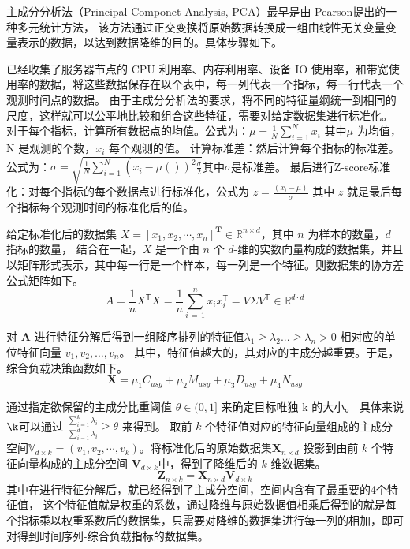 主成分分析法（Principal Componet Analysis, PCA）最早是由 Pearson\cite{kpfrs1901lines}提出的一种多元统计方法，
该方法通过正交变换将原始数据转换成一组由线性无关变量变量表示的数据，以达到数据降维的目的\cite{李可佳2023基于主成分分析和函数机制的差分隐私线性回归算法}。具体步骤如下。

已经收集了服务器节点的 CPU 利用率、内存利用率、设备 IO 使用率，和带宽使用率的数据，将这些数据保存在以个表中，每一列代表一个指标，每一行代表一个观测时间点的数据。
由于主成分分析法的要求，将不同的特征量纲统一到相同的尺度，这样就可以公平地比较和组合这些特征，需要对给定数据集进行标准化。
对于每个指标，计算所有数据点的均值。公式为：$\mu=\frac{1}{N}\sum_{i=1}^{N}x_{i}$ 其中$\mu$ 为均值，N 是观测的个数，$x_{i}$ 每个观测的值。
计算标准差：然后计算每个指标的标准差。公式为：$\sigma = \sqrt{\frac{1}{N} \sum_{i = 1}^{N} \left(\right. x_{i} - \mu \left(\left.\right)\right)^{2}\frac{\sigma}{2}}$其中$\sigma$是标准差。
最后进行Z-score标准化：对每个指标的每个数据点进行标准化，公式为 $z = \frac{(x_{i} - \mu)}{\sigma}$ 其中 $z$ 就是最后每个指标每个观测时间的标准化后的值。

给定标准化后的数据集 $X = [x_1, x_2, \cdots, x_n]^{\mathbf{T}} \in \mathbb{R}^{n \times d}$，其中 $n$ 为样本的数量，$d$ 指标的数量，
结合在一起，\( X \) 是一个由 \( n \) 个 \( d \)-维的实数向量构成的数据集，并且以矩阵形式表示，其中每一行是一个样本，每一列是一个特征。则数据集的协方差公式矩阵如下。
\begin{equation}
  A={\frac{1}{n}}X^{\mathsf{T}}X={\frac{1}{n}}\sum_{i\,=\,1}^{n}x_{i}x_{i}^{\mathsf{T}}=V\Sigma V^{\mathsf{T}}\in\mathbb{R}^{d\cdot d}
\end{equation}

对 $\mathbf{A}$ 进行特征分解后得到一组降序排列的特征值$\lambda_1 \ge \lambda_2 ... \ge \lambda_n > 0$ 相对应的单位特征向量 $v_1, v_2, \dots, v_n$。
其中，特征值越大的，其对应的主成分越重要。于是，综合负载决策函数如下。
\begin{equation}
  \mathbf{X} = \mu_1C_{usg} + \mu_2M_{usg} + \mu_3D_{usg} + \mu_4N_{usg}
\end{equation}

通过指定欲保留的主成分比重阈值 $\theta \in (0, 1]$ 来确定目标唯独 k 的大小。
具体来说$\k$可以通过 $\frac{\sum^{k}_{i = 1}\lambda_i}{\sum^{d}_{i = 1}\lambda_i} \ge \theta$ 来得到。
取前 $k$ 个特征值对应的特征向量组成的主成分空间$\mathbb{V}_{d \times k} = (v_1, v_2, \cdots, v_k)$。将标准化后的原始数据集$\mathbf{X}_{n \times d}$ 投影到由前 $k$ 个特征向量构成的主成分空间 $\mathbf{V}_{d \times k}$中，得到了降维后的 $k$ 维数据集。
\begin{equation}
  \mathbf{Z}_{n \times k} = \mathbf{X}_{n \times d}\mathbf{V}_{d \times k}
\end{equation}
其中在进行特征分解后，就已经得到了主成分空间，空间内含有了最重要的4个特征值，
这个特征值就是权重的系数，通过降维与原始数据值相乘后得到的就是每个指标乘以权重系数后的数据集，只需要对降维的数据集进行每一列的相加，即可对得到时间序列-综合负载指标的数据集。

